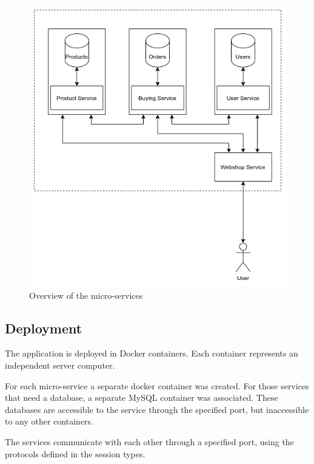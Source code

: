 \documentclass{article}
\begin{document}
\begin{figure}[H]
    \centering
    \includegraphics[width=\linewidth]{img/services.png}
    \caption{Overview of the micro-services}
\end{figure}

\subsection {Deployment}
  
The application is deployed in Docker containers. Each container represents an independent server computer. 

For each micro-service a separate docker container was created. For those services that need a database, a separate MySQL container was associated. These databases are accessible to the service through the specified port, but inaccessible to any other containers.

The services communicate with each other through a specified port, using the protocols defined in the session types.
\end{document}
